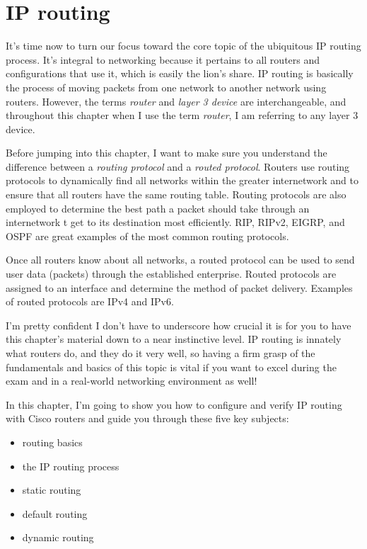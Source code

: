 \chapter{IP routing}
\label{chap:ip-routing}

It's time now to turn our focus toward the core topic of the ubiquitous IP routing process.
It's integral to networking because it pertains to all routers and configurations that use it, which is easily the lion's share.
IP routing is basically the process of moving packets from one network to another network using routers.
However, the terms \emph{router} and \emph{layer 3 device} are interchangeable, and throughout this chapter when I use the term \emph{router},
I am referring to any layer 3 device.

Before jumping into this chapter, I want to make sure you understand the difference between a \emph{routing protocol} and a \emph{routed protocol}.
Routers use routing protocols to dynamically find all networks within the greater internetwork and to ensure that all routers have the same routing table.
Routing protocols are also employed to determine the best path a packet should take through an internetwork t get to its destination most efficiently.
RIP, RIPv2, EIGRP, and OSPF are great examples of the most common routing protocols.

Once all routers know about all networks, a routed protocol can be used to send user data (packets) through the established enterprise.
Routed protocols are assigned to an interface and determine the method of packet delivery.
Examples of routed protocols are IPv4 and IPv6.

I'm pretty confident I don't have to underscore how crucial it is for you to have this chapter's material down to a near instinctive level.
IP routing is innately what routers do, and they do it very well,
so having a firm grasp of the fundamentals and basics of this topic is vital if you want to excel during the exam and in a real-world networking environment as well!

In this chapter, I'm going to show you how to configure and verify IP routing with Cisco routers and guide you through these five key subjects:
\begin{itemize}
\item routing basics
\item the IP routing process
\item static routing
\item default routing
\item dynamic routing
\end{itemize}

